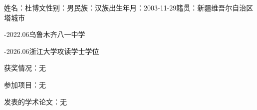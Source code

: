 \cleardoublepage
{}

\noindent 姓名：杜博文\quad 性别：男\quad 民族：汉族\quad 出生年月：2003-11-29\quad 籍贯：新疆维吾尔自治区塔城市

\vspace{0.5em}

-2022.06\quad\quad 乌鲁木齐八一中学

-2026.06\quad\quad 浙江大学攻读学士学位

\vspace{0.5em}

\noindent 获奖情况：无

\vspace{0.5em}

\noindent 参加项目：无

\vspace{0.5em}

\noindent 发表的学术论文：无